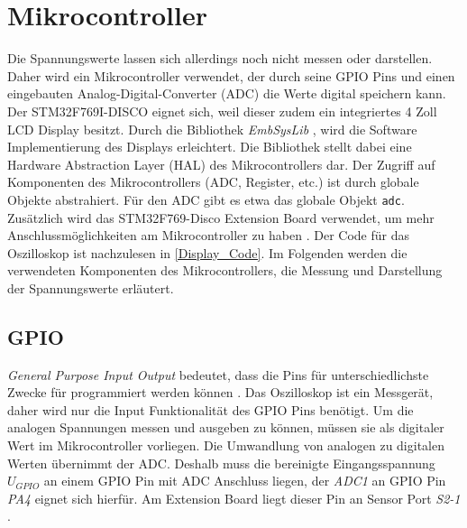 \section{Mikrocontroller}
\label{Mikrocontroller}

Die Spannungswerte lassen sich allerdings noch nicht messen oder darstellen.
Daher wird ein Mikrocontroller verwendet, der durch seine GPIO Pins und einen eingebauten
Analog-Digital-Converter (ADC) die Werte digital speichern kann.
Der STM32F769I-DISCO eignet sich, weil dieser zudem ein integriertes 4 Zoll LCD Display
besitzt\cite{MikroControllerDatasheet_1}.
Durch die Bibliothek \textit{EmbSysLib} \cite{EmbSysLib}, wird die Software Implementierung des
Displays erleichtert.
Die Bibliothek stellt dabei eine Hardware Abstraction Layer (HAL) des Mikrocontrollers dar.
Der Zugriff auf Komponenten des Mikrocontrollers (ADC, Register, etc.) ist durch globale Objekte
abstrahiert. Für den ADC gibt es etwa das globale Objekt \texttt{adc}.
Zusätzlich wird das STM32F769-Disco Extension Board verwendet, um mehr
Anschlussmöglichkeiten am Mikrocontroller zu haben \cite{MikrocontrollerExtension}.
Der Code für das Oszilloskop ist nachzulesen in \ref{Display_Code}.
Im Folgenden werden die verwendeten Komponenten des Mikrocontrollers, die Messung und
Darstellung der Spannungswerte erläutert.

\subsection{GPIO}
\textit{General Purpose Input Output} bedeutet, dass die Pins für unterschiedlichste Zwecke für
programmiert werden können \cite{RPI-GPIO}. \newline
Das Oszilloskop ist ein Messgerät, daher wird nur die Input Funktionalität des GPIO Pins benötigt.
Um die analogen Spannungen messen und ausgeben zu können, müssen sie als digitaler Wert
im Mikrocontroller vorliegen. \newline
Die Umwandlung von analogen zu digitalen Werten übernimmt der ADC\cite{MikroControllerDatasheet_1}.
Deshalb muss die bereinigte Eingangsspannung $U_{GPIO}$ an einem GPIO Pin mit ADC Anschluss liegen,
der \textit{ADC1} an GPIO Pin \textit{PA4} eignet sich hierfür\cite{STM32F769_PinLayout, MikroControllerDatasheet_Pins}.
Am Extension Board liegt dieser Pin an Sensor Port \textit{S2-1} \cite{MikrocontrollerExtension}.


